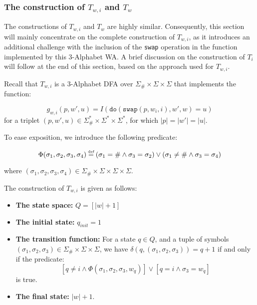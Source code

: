 \subsubsection{The construction of $T_{w,i}$ and $T_{w}$} 

The constructions of $T_{w,i}$ and $T_{w}$ are highly similar. Consequently, this section will mainly concentrate on the complete construction of $T_{w,i}$, as it introduces an additional challenge with the inclusion of the \texttt{swap} operation in the function implemented by this 3-Alphabet WA. A brief discussion on the construction of $T_{i}$ will follow at the end of this section, based on the approach used for $T_{w,i}$.


Recall that $T_{w,i}$ is a 3-Alphabet DFA over $\Sigma_{\#} \times \Sigma \times \Sigma$ that implements the function: 

$$g_{w,i}(p,w',u) = I(\texttt{do}(\texttt{swap}(p,w_{i},i),w',w)= u)$$
for a triplet $(p,w',u) \in \Sigma_{\#}^{*} \times \Sigma^{*} \times \Sigma^{*}$, for which $|p| = |w'| = |u|$.

To ease exposition, we introduce the following predicate:

\begin{equation} \label{app:eq:predicateTwi}
 \Phi(\sigma_{1}, \sigma_{2}, \sigma_{3}, \sigma_{4}) \myeq  \left( \sigma_{1} = \# \land \sigma_{3} = \sigma_{2} \right) \lor \left(\sigma_{1} \neq \# \land \sigma_{3} = \sigma_{4} \right) 
\end{equation}

where $(\sigma_{1}, \sigma_{2}, \sigma_{3}, \sigma_{4}) \in \Sigma_{\#} \times \Sigma \times \Sigma \times \Sigma$. 

The construction of $T_{w,i}$ is given as follows:
\begin{itemize}
    \item \textbf{The state space:} $Q = [|w| + 1]$
    \item \textbf{The initial state:} $q_{init} = 1$
    \item \textbf{The transition function:} For a state $q \in Q$, and a tuple of symbols $(\sigma_{1}, \sigma_{2}, \sigma_{3}) \in \Sigma_{\#} \times \Sigma \times \Sigma$, we have $\delta(q, (\sigma_{1}, \sigma_{2}, \sigma_{3})) = q+1$ if and only if the predicate:
    \begin{equation} \label{app:eq:Twi}
    \left[q \neq i \land \Phi(\sigma_{1},\sigma_{2}, \sigma_{3}, w_{q}) \right] \lor \left[q = i \land \sigma_{3} = w_{q} \right]
    \end{equation}
    is true.
    \item \textbf{The final state:} $|w| + 1$.
\end{itemize}

